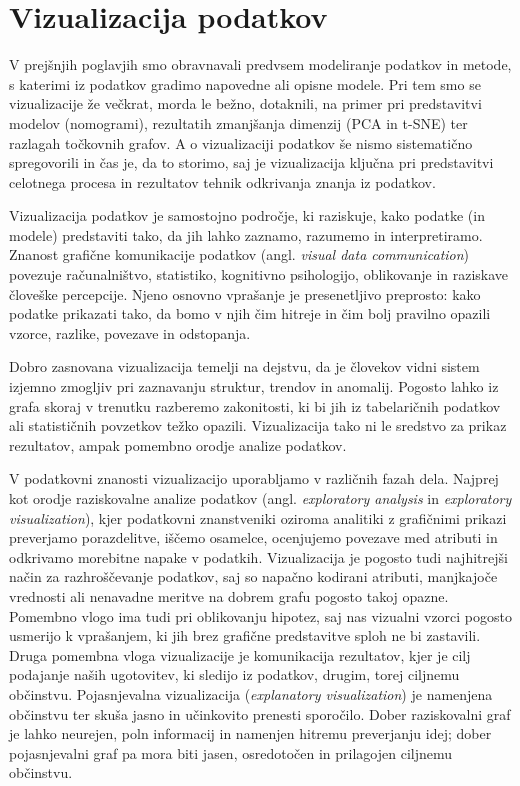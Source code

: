 \chapter{Vizualizacija podatkov}

V prejšnjih poglavjih smo obravnavali predvsem modeliranje podatkov in metode, s katerimi iz podatkov gradimo napovedne ali opisne modele. Pri tem smo se vizualizacije že večkrat, morda le bežno, dotaknili, na primer pri predstavitvi modelov (nomogrami), rezultatih zmanjšanja dimenzij (PCA in t-SNE) ter razlagah točkovnih grafov. A o vizualizaciji podatkov še nismo sistematično spregovorili in čas je, da to storimo, saj je vizualizacija ključna pri predstavitvi celotnega procesa in rezultatov tehnik odkrivanja znanja iz podatkov.

Vizualizacija podatkov je samostojno področje, ki raziskuje, kako podatke (in modele) predstaviti tako, da jih lahko zaznamo, razumemo in interpretiramo. Znanost grafične komunikacije podatkov (angl. \emph{visual data communication}) povezuje računalništvo, statistiko, kognitivno psihologijo, oblikovanje in raziskave človeške percepcije. Njeno osnovno vprašanje je presenetljivo preprosto: kako podatke prikazati tako, da bomo v njih čim hitreje in čim bolj pravilno opazili vzorce, razlike, povezave in odstopanja.

Dobro zasnovana vizualizacija temelji na dejstvu, da je človekov vidni sistem izjemno zmogljiv pri zaznavanju struktur, trendov in anomalij.
%
%
Pogosto lahko iz grafa skoraj v trenutku razberemo zakonitosti, ki bi jih iz tabelaričnih podatkov ali statističnih povzetkov težko opazili. Vizualizacija tako ni le sredstvo za prikaz rezultatov, ampak pomembno orodje analize podatkov. 

V podatkovni znanosti vizualizacijo uporabljamo v različnih fazah dela. Najprej kot orodje raziskovalne analize podatkov (angl. \emph{exploratory analysis} in \emph{exploratory visualization}), kjer podatkovni znanstveniki oziroma analitiki z grafičnimi prikazi preverjamo porazdelitve, iščemo osamelce, ocenjujemo povezave med atributi in odkrivamo morebitne napake v podatkih. Vizualizacija je pogosto tudi najhitrejši način za razhroščevanje podatkov, saj so napačno kodirani atributi, manjkajoče vrednosti ali nenavadne meritve na dobrem grafu pogosto takoj opazne. Pomembno vlogo ima tudi pri oblikovanju hipotez, saj nas vizualni vzorci pogosto usmerijo k vprašanjem, ki jih brez grafične predstavitve sploh ne bi zastavili. Druga pomembna vloga vizualizacije je komunikacija rezultatov, kjer je cilj podajanje naših ugotovitev, ki sledijo iz podatkov, drugim, torej ciljnemu občinstvu. Pojasnjevalna vizualizacija (\emph{explanatory visualization}) je namenjena občinstvu ter skuša jasno in učinkovito prenesti sporočilo. Dober raziskovalni graf je lahko neurejen, poln informacij in namenjen hitremu preverjanju idej; dober pojasnjevalni graf pa mora biti jasen, osredotočen in prilagojen ciljnemu občinstvu.

